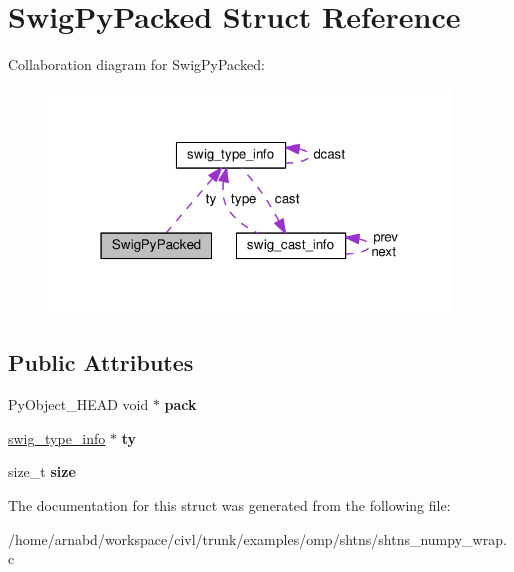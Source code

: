 \hypertarget{structSwigPyPacked}{}\section{Swig\+Py\+Packed Struct Reference}
\label{structSwigPyPacked}


Collaboration diagram for Swig\+Py\+Packed\+:
\nopagebreak
\begin{figure}[H]
\begin{center}
\leavevmode
\includegraphics[width=304pt]{structSwigPyPacked__coll__graph}
\end{center}
\end{figure}
\subsection*{Public Attributes}
\begin{DoxyCompactItemize}
\item 
\hypertarget{structSwigPyPacked_af5122bcb9e73bf2dec4ce5f58f004e1b}{}Py\+Object\+\_\+\+H\+E\+A\+D void $\ast$ {\bfseries pack}\label{structSwigPyPacked_af5122bcb9e73bf2dec4ce5f58f004e1b}

\item 
\hypertarget{structSwigPyPacked_aa6f6be0a8a1bff7710200fbe8d51acf0}{}\hyperlink{structswig__type__info}{swig\+\_\+type\+\_\+info} $\ast$ {\bfseries ty}\label{structSwigPyPacked_aa6f6be0a8a1bff7710200fbe8d51acf0}

\item 
\hypertarget{structSwigPyPacked_aed2bfb8fb3c9f804c386215db63921cb}{}size\+\_\+t {\bfseries size}\label{structSwigPyPacked_aed2bfb8fb3c9f804c386215db63921cb}

\end{DoxyCompactItemize}


The documentation for this struct was generated from the following file\+:\begin{DoxyCompactItemize}
\item 
/home/arnabd/workspace/civl/trunk/examples/omp/shtns/shtns\+\_\+numpy\+\_\+wrap.\+c\end{DoxyCompactItemize}
